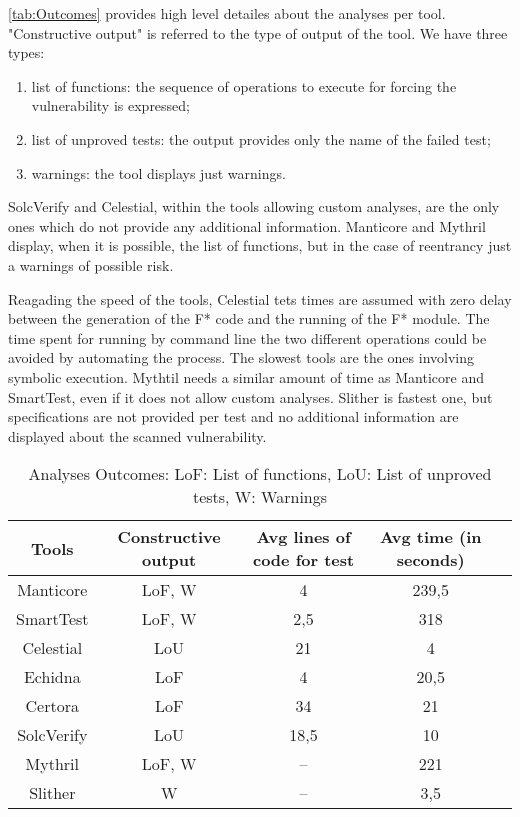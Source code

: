 \autoref{tab:Outcomes} provides high level detailes about the analyses per tool. 
"Constructive output" is referred to the type of output of the tool. 
We have three types:
\begin{enumerate}
    \item list of functions: the sequence of operations to execute for forcing the vulnerability is expressed;
    \item list of unproved tests: the output provides only the name of the failed test;
    \item warnings: the tool displays just warnings.
\end{enumerate}

SolcVerify and Celestial, within the tools allowing custom analyses, are the only ones which do not provide any additional information. 
Manticore and Mythril display, when it is possible, the list of functions, but in the case of reentrancy just a warnings of possible risk. 

Reagading the speed of the tools, Celestial tets times are assumed with zero delay between the generation of the F* code and the running of the F* module. 
The time spent for running by command line the two different operations could be avoided by automating the process.
The slowest tools are the ones involving symbolic execution. Mythtil needs a similar amount of time as Manticore and SmartTest, even if it does not allow custom analyses. 
Slither is fastest one, but specifications are not provided per test and no additional information are displayed about the scanned vulnerability.
\begin{center}
    \begin{table*}
        \footnotesize
        \caption{Analyses Outcomes: 
        LoF: List of functions, LoU: List of unproved tests, W: Warnings}
        \label{tab:Outcomes}
        \begin{tabular}{ccccc}
        \toprule
        Tools  & Constructive output &  Avg lines of code for test & Avg time (in seconds) \\
        \midrule
            Manticore & LoF, W  & 4  &  239,5 \\
            SmartTest & LoF, W & 2,5 &  318  \\
            Celestial & LoU & 21  &  4  \\
            Echidna & LoF  & 4  & 20,5 \\
            Certora & LoF   & 34 &  21  \\ 
            SolcVerify & LoU  &  18,5 &  10  \\
            Mythril & LoF, W  & --  &  221  \\ 
            Slither& W & --  &  3,5  \\ 
        \bottomrule
        \end{tabular}
    \end{table*}
\end{center}

